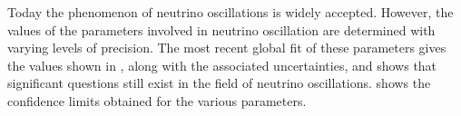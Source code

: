 
Today the phenomenon of neutrino oscillations is widely accepted. 
However, the values of the parameters involved in neutrino oscillation are determined with varying levels of precision.
The most recent global fit of these parameters gives the values shown in , along with the associated uncertainties, and shows that significant questions still exist in the field of neutrino oscillations.
 shows the confidence limits obtained for the various parameters.

